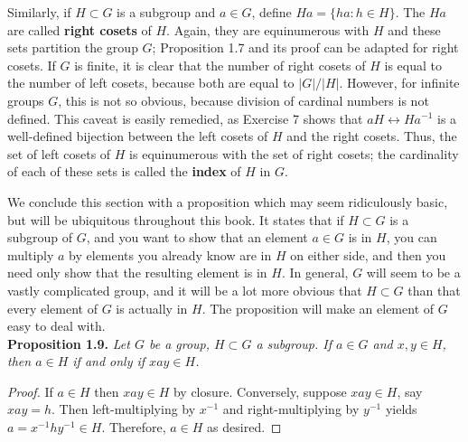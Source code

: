 \documentclass[leqno]{book}
\begin{document}
\noindent Similarly, if $H\subset G$ is a subgroup and $a\in G$, define $Ha=\{ha:h\in H\}$.  The $Ha$ are called \textbf{right cosets} of $H$.  Again, they are equinumerous with $H$ and these sets partition the group $G$; Proposition 1.7 and its proof can be adapted for right cosets.  If $G$ is finite, it is clear that the number of right cosets of $H$ is equal to the number of left cosets, because both are equal to $|G|/|H|$.  However, for infinite groups $G$, this is not so obvious, because division of cardinal numbers is not defined.  This caveat is easily remedied, as Exercise 7 shows that $aH\leftrightarrow Ha^{-1}$ is a well-defined bijection between the left cosets of $H$ and the right cosets.  Thus, the set of left cosets of $H$ is equinumerous with the set of right cosets; the cardinality of each of these sets is called the \textbf{index} of $H$ in $G$.

We conclude this section with a proposition which may seem ridiculously basic, but will be ubiquitous throughout this book.  It states that if $H\subset G$ is a subgroup of $G$, and you want to show that an element $a\in G$ is in $H$, you can multiply $a$ by elements you already know are in $H$ on either side, and then you need only show that the resulting element is in $H$.  In general, $G$ will seem to be a vastly complicated group, and it will be a lot more obvious that $H\subset G$ than that every element of $G$ is actually in $H$.  The proposition will make an element of $G$ easy to deal with.\\

\noindent\textbf{Proposition 1.9.} \emph{Let $G$ be a group, $H\subset G$ a subgroup.  If $a\in G$ and $x,y\in H$, then $a\in H$ if and only if $xay\in H$.}
\begin{proof}
If $a\in H$ then $xay\in H$ by closure.  Conversely, suppose $xay\in H$, say $xay=h$.  Then left-multiplying by $x^{-1}$ and right-multiplying by $y^{-1}$ yields $a=x^{-1}hy^{-1}\in H$.  Therefore, $a\in H$ as desired.
\end{proof}
\end{document}
